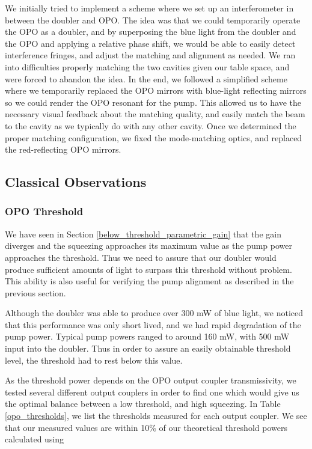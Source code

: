 We initially tried to implement a scheme where we set up an interferometer in between the doubler and OPO.  The idea was that we could temporarily operate the OPO as a doubler, and by superposing the blue light from the doubler and the OPO and applying a relative phase shift, we would be able to easily detect interference fringes, and adjust the matching and alignment as needed.  We ran into difficulties properly matching the two cavities given our table space, and were forced to abandon the idea.  In the end, we followed a simplified scheme where we temporarily replaced the OPO mirrors with blue-light reflecting mirrors so we could render the OPO resonant for the pump.  This allowed us to have the necessary visual feedback about the matching quality, and easily match the beam to the cavity as we typically do with any other cavity.  Once we determined the proper matching configuration, we fixed the mode-matching optics, and replaced the red-reflecting OPO mirrors.

\subsection{Classical Observations} 
\label{classical observations} 




\subsubsection{OPO Threshold} 
\label{opo_threshold} 

We have seen in Section \ref{below_threshold_parametric_gain} that the gain diverges and the squeezing approaches its maximum value as the pump power approaches the threshold.  Thus we need to assure that our doubler would produce sufficient amounts of light to surpass this threshold without problem.  This ability is also useful for verifying the pump alignment as described in the previous section.

Although the doubler was able to produce over 300 mW of blue light, we noticed that this performance was only short lived, and we had rapid degradation of the pump power.  Typical pump powers ranged to around 160 mW, with 500 mW input into the doubler.  Thus in order to assure an easily obtainable threshold level, the threshold had to rest below this value.

As the threshold power depends on the OPO output coupler transmissivity, we tested several different output couplers in order to find one which would give us the optimal balance between a low threshold, and high squeezing.  In Table \ref{opo_thresholds}, we list the thresholds measured for each output coupler.  We see that our measured values are within 10\% of our theoretical threshold powers calculated using 


